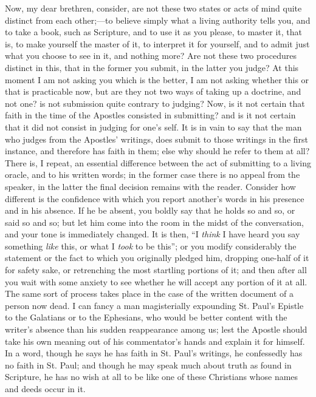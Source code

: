 Now, my dear brethren, consider, are not these two states or acts
of mind quite distinct from each other;—to believe simply what a
living authority tells you, and to take a book, such as Scripture, and
to use it as you please, to master it, that is, to make yourself the
master of it, to interpret it for yourself, and to admit just what you
choose to see in it, and nothing more? Are not these two procedures
distinct in this, that in the former you submit, in the latter you
judge? At this moment I am not asking you which is the better, I am
not asking whether this or that is practicable now, but are they not
two ways of taking up a doctrine, and not one? is not submission quite
contrary to judging? Now, is it not certain that faith in the time of
the Apostles consisted in submitting? and is it not certain that it
did not consist in judging for one's self. It is in vain to say that
the man who judges from the Apostles' writings, does submit to those
writings in the first instance, and therefore has faith in them; else
why should he refer to them at all? There is, I repeat, an essential
difference between the act of submitting to a living oracle, and to
his written words; in the former case there is no appeal from the
speaker, in the latter the final decision remains with the reader.
Consider how different is the confidence with which you report
another's words in his presence and in his absence. If he be absent,
you boldly say that he holds so and so, or said so and so; but let him
come into the room in the midst of the conversation, and your tone is
immediately changed. It is then, ``I \emph{think} I have heard you
say something \emph{like} this, or what I \emph{took} to be this''; or
you modify considerably the statement or the fact to which you
originally pledged him, dropping one-half of it for safety sake, or
retrenching the most startling portions of it; and then after all you
wait with some anxiety to see whether he will accept any portion of it
at all. The same sort of process takes place in the case of the
written document of a person now dead. I can fancy a man magisterially
expounding St. Paul's Epistle to the Galatians or to the Ephesians,
who would be better content with the writer's absence than his sudden
reappearance among us; lest the Apostle should take his own meaning
out of his commentator's hands and explain it for himself. In a word,
though he says he has faith in St. Paul's writings, he confessedly has
no faith in St. Paul; and though he may speak much about truth as
found in Scripture, he has no wish at all to be like one of these
Christians whose names and deeds occur in it.

